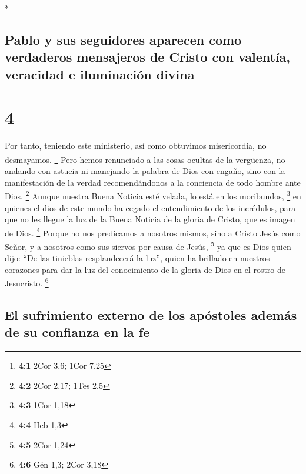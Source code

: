 \begin{paracol}{2}
\begin{otherlanguage}{english}
\end{otherlanguage}

\switchcolumn[0]*

\hypertarget{pablo-y-sus-seguidores-aparecen-como-verdaderos-mensajeros-de-cristo-con-valentuxeda-veracidad-e-iluminaciuxf3n-divina}{%
\subsection{Pablo y sus seguidores aparecen como verdaderos mensajeros
de Cristo con valentía, veracidad e iluminación
divina}\label{pablo-y-sus-seguidores-aparecen-como-verdaderos-mensajeros-de-cristo-con-valentuxeda-veracidad-e-iluminaciuxf3n-divina}}

\hypertarget{section-6}{%
\section{4}\label{section-6}}

 Por tanto, teniendo este ministerio, así como obtuvimos
misericordia, no desmayamos. \footnote{\textbf{4:1} 2Cor 3,6; 1Cor 7,25}
 Pero hemos renunciado a las cosas ocultas de la
vergüenza, no andando con astucia ni manejando la palabra de Dios con
engaño, sino con la manifestación de la verdad recomendándonos a la
conciencia de todo hombre ante Dios. \footnote{\textbf{4:2} 2Cor 2,17;
  1Tes 2,5}  Aunque nuestra Buena Noticia esté velada, lo
está en los moribundos, \footnote{\textbf{4:3} 1Cor 1,18} 
en quienes el dios de este mundo ha cegado el entendimiento de los
incrédulos, para que no les llegue la luz de la Buena Noticia de la
gloria de Cristo, que es imagen de Dios. \footnote{\textbf{4:4} Heb 1,3}
 Porque no nos predicamos a nosotros mismos, sino a Cristo
Jesús como Señor, y a nosotros como sus siervos por causa de Jesús,
\footnote{\textbf{4:5} 2Cor 1,24}  ya que es Dios quien
dijo: ``De las tinieblas resplandecerá la luz'', quien ha brillado en
nuestros corazones para dar la luz del conocimiento de la gloria de Dios
en el rostro de Jesucristo. \footnote{\textbf{4:6} Gén 1,3; 2Cor 3,18}

\hypertarget{el-sufrimiento-externo-de-los-apuxf3stoles-ademuxe1s-de-su-confianza-en-la-fe}{%
\subsection{El sufrimiento externo de los apóstoles además de su
confianza en la
fe}\label{el-sufrimiento-externo-de-los-apuxf3stoles-ademuxe1s-de-su-confianza-en-la-fe}}


\end{paracol}
